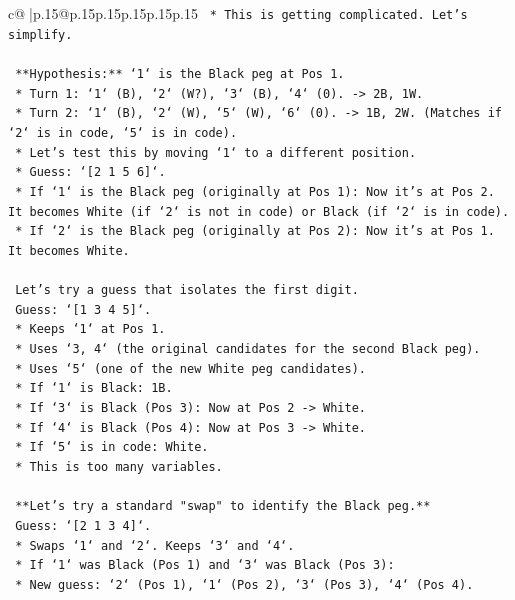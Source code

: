\documentclass{article}
\begin{document}
{\begin{supertabular}{c@{$\;$}|p{.15\linewidth}@{}p{.15\linewidth}p{.15\linewidth}p{.15\linewidth}p{.15\linewidth}p{.15\linewidth}}
{{{\texttt{    *   This is getting complicated. Let's simplify.} \\
\\ 
\texttt{    **Hypothesis:** `1` is the Black peg at Pos 1.} \\
\texttt{    *   Turn 1: `1` (B), `2` (W?), `3` (B), `4` (0). {-}> 2B, 1W.} \\
\texttt{    *   Turn 2: `1` (B), `2` (W), `5` (W), `6` (0). {-}> 1B, 2W. (Matches if `2` is in code, `5` is in code).} \\
\texttt{    *   Let's test this by moving `1` to a different position.} \\
\texttt{    *   Guess: `{[}2 1 5 6{]}`.} \\
\texttt{        *   If `1` is the Black peg (originally at Pos 1): Now it's at Pos 2. It becomes White (if `2` is not in code) or Black (if `2` is in code).} \\
\texttt{        *   If `2` is the Black peg (originally at Pos 2): Now it's at Pos 1. It becomes White.} \\
\\ 
\texttt{    Let's try a guess that isolates the first digit.} \\
\texttt{    Guess: `{[}1 3 4 5{]}`.} \\
\texttt{    *   Keeps `1` at Pos 1.} \\
\texttt{    *   Uses `3, 4` (the original candidates for the second Black peg).} \\
\texttt{    *   Uses `5` (one of the new White peg candidates).} \\
\texttt{    *   If `1` is Black: 1B.} \\
\texttt{    *   If `3` is Black (Pos 3): Now at Pos 2 {-}> White.} \\
\texttt{    *   If `4` is Black (Pos 4): Now at Pos 3 {-}> White.} \\
\texttt{    *   If `5` is in code: White.} \\
\texttt{    *   This is too many variables.} \\
\\ 
\texttt{    **Let's try a standard "swap" to identify the Black peg.**} \\
\texttt{    Guess: `{[}2 1 3 4{]}`.} \\
\texttt{    *   Swaps `1` and `2`. Keeps `3` and `4`.} \\
\texttt{    *   If `1` was Black (Pos 1) and `3` was Black (Pos 3):} \\
\texttt{        *   New guess: `2` (Pos 1), `1` (Pos 2), `3` (Pos 3), `4` (Pos 4).} \\
}}}
\end{supertabular}}
\end{document}
